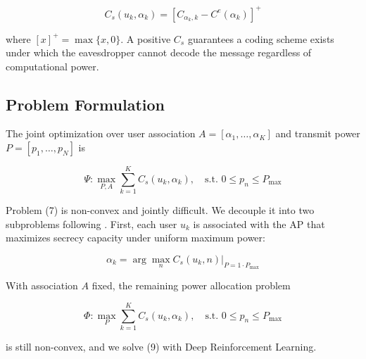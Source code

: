 \documentclass[conference]{IEEEtran}
\begin{document}
\begin{equation}
C_s(u_k,\alpha_k)=
\left[C_{\alpha_k,k}-C^e(\alpha_k)\right]^+
\end{equation}

where $[x]^+=\max\{x,0\}$. A positive $C_s$ guarantees a coding scheme exists under which the eavesdropper cannot decode the message regardless of computational power.

\subsection{Problem Formulation}

The joint optimization over user association $A=[\alpha_1,\dots,\alpha_K]$ and transmit power $P=[p_1,\dots,p_N]$ is

\begin{equation}
\Psi:\max_{P,A}\sum_{k=1}^{K}C_s(u_k,\alpha_k),
\quad
\text{s.t. }0\leq p_n\leq P_{\max}
\end{equation}

Problem (7) is non-convex and jointly difficult. We decouple it into two subproblems following \cite{hoseini}. First, each user $u_k$ is associated with the AP that maximizes secrecy capacity under uniform maximum power:

\begin{equation}
\alpha_k=
\arg\max_n
C_s(u_k,n)\big|_{P=1\cdot P_{\max}}
\end{equation}

With association $A$ fixed, the remaining power allocation problem

\begin{equation}
\Phi:\max_{P}\sum_{k=1}^{K}C_s(u_k,\alpha_k),
\quad
\text{s.t. }0\leq p_n\leq P_{\max}
\end{equation}

is still non-convex, and we solve (9) with Deep Reinforcement Learning.
\end{document}
